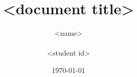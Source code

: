\documentclass[11pt,a4paper,UKenglish]{memoir}
\title{<document title>}
\author{<name>\\
        \\
        <student id>
}
\date{\today}
\begin{document}
\frontmatter %



\tableofcontents
\listoffigures
\listoftables

\mainmatter %







\appendix %
\renewcommand{\appendixtocname}{Appendix} %
\addappheadtotoc %

\backmatter %
\end{document}
